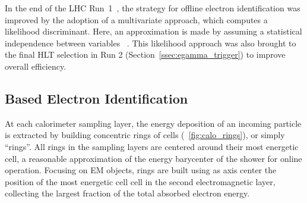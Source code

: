 In the end of the LHC Run~1~\cite{PERF-2016-01}, the strategy for offline electron identification was improved by the adoption of a multivariate approach, which computes a likelihood discriminant. Here, an approximation is made by assuming a statistical independence between variables ~\cite{kendalls_vol2b}. This likelihood approach was also brought to the final HLT selection in Run 2 (Section~\ref{ssec:egamma_trigger}) to improve overall efficiency. 


\newpage

\subsection{\rnn{} Based Electron Identification}%

At each calorimeter sampling layer, the energy deposition of an incoming particle is extracted by building concentric rings of cells (\figurename~\ref{fig:calo_rings}), or simply ``rings''. All rings in the \ecal sampling layers are
centered around their most energetic cell, a reasonable
approximation of the energy barycenter of the shower for online
operation. Focusing on EM objects, rings are built using as axis center the position of the most energetic cell cell in the second electromagnetic layer, collecting the largest fraction of the total absorbed electron energy.


